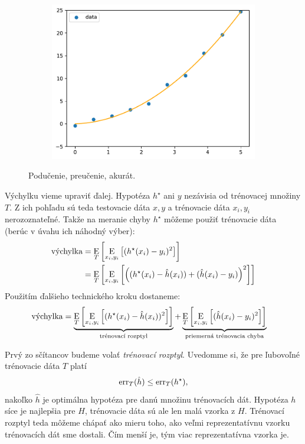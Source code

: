 \begin{figure}
\begin{subfigure}[b]{0.3\textwidth}
  \end{subfigure}
  ~
  \begin{subfigure}[b]{0.3\textwidth}
    \includegraphics[width=\linewidth]{obrazky/fitting2.pdf}
  \end{subfigure}
  \caption{Podučenie, preučenie, akurát.}
  \label{img:fitting}
\end{figure}

\medskip

Výchylku vieme upraviť ďalej. Hypotéza $h^\star$ ani $y$ nezávisia
od trénovacej množiny $T$. Z ich pohľadu sú teda testovacie dáta $x, y$
a trénovacie dáta $x_i, y_i$ nerozoznateľné. Takže na meranie chyby
$h^\star$ môžeme použiť trénovacie dáta (berúc v úvahu ich náhodný
výber):
\begin{align}
  \vychylka
    &= \E_T \left[ \E_{x_i, y_i} \left[ (h^\star(x_i) - y_i)^2 \right] \right] \\
    &= \E_T \left[ \E_{x_i, y_i} \left[ \left( (h^\star(x_i) - \hat{h}(x_i)) + (\hat{h}(x_i) - y_i) \right)^2 \right] \right]
\end{align}
Použitím ďalšieho technického kroku dostaneme:
\begin{align}
  \vychylka &= \underbrace{\E_T \left[ \E_{x_i, y_i} \left[ (h^\star(x_i) - \hat{h}(x_i))^2 \right] \right]}_{\text{trénovací rozptyl}}
    + \underbrace{\E_T \left[ \E_{x_i, y_i} \left[ (\hat{h}(x_i) - y_i)^2 \right] \right]}_{\text{priemerná trénovacia chyba}}
\end{align}

Prvý zo sčítancov budeme volať \emph{trénovací rozptyl}.
Uvedomme si, že pre ľubovoľné trénovacie dáta $T$ platí
$$\err_T(\hat{h}) \leq \err_T(h^\star),$$
nakoľko $\hat{h}$ je optimálna hypotéza pre danú množinu trénovacích
dát. Hypotéza $h$ síce je najlepšia pre $H$, trénovacie dáta sú ale len
malá vzorka z $H$.
Trénovací rozptyl teda môžeme chápať ako mieru toho, ako veľmi
reprezentatívnu vzorku trénovacích dát sme dostali. Čím menší je,
tým viac reprezentatívna vzorka je.

